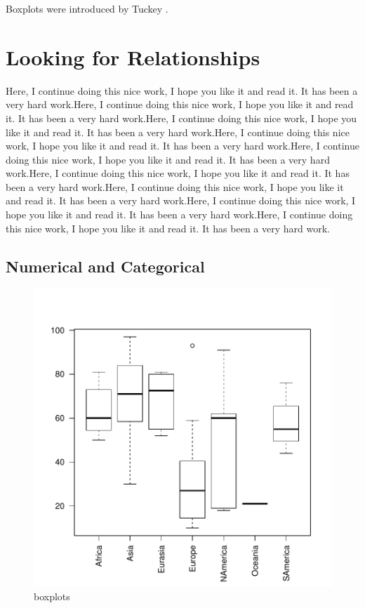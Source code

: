 \documentclass[11pt]{article}
\begin{document}
Boxplots were introduced by Tuckey \cite{tukey_exploratory_1977}.

\section{Looking for Relationships}\label{bivar}


Here, I continue doing this nice work, I hope you like it and read it. It has been a very hard work.Here, I continue doing this nice work, I hope you like it and read it. It has been a very hard work.Here, I continue doing this nice work, I hope you like it and read it. It has been a very hard work.Here, I continue doing this nice work, I hope you like it and read it. It has been a very hard work.Here, I continue doing this nice work, I hope you like it and read it. It has been a very hard work.Here, I continue doing this nice work, I hope you like it and read it. It has been a very hard work.Here, I continue doing this nice work, I hope you like it and read it. It has been a very hard work.Here, I continue doing this nice work, I hope you like it and read it. It has been a very hard work.Here, I continue doing this nice work, I hope you like it and read it. It has been a very hard work.

\subsection{Numerical and  Categorical}\label{binumcat}


\begin{figure}[h]
\centering
\begin{adjustbox}{width=7cm,height=7cm,clip,trim=0cm 0cm 0cm 0cm} 
\includegraphics{PaperInR_8-numcat_plot}
\end{adjustbox}
\caption{boxplots}  %
\label{numcat_plot} %
\end{figure}
\end{document}
